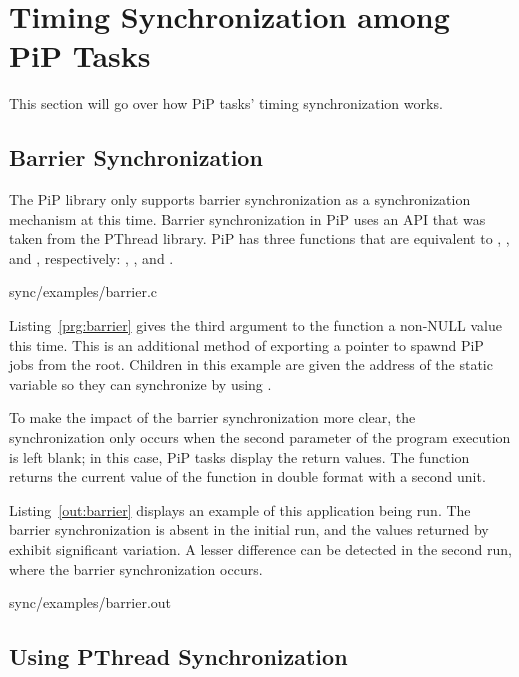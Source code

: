 
\section{Timing Synchronization among PiP Tasks}

This section will go over how PiP tasks' timing synchronization works.

\subsection{Barrier Synchronization}

The PiP library only supports barrier synchronization as a
synchronization mechanism at this time. Barrier synchronization in PiP
uses an API that was taken from the PThread library. PiP has three
functions that are equivalent to ,
, and
, respectively:
, , and
. 

 {sync/examples/barrier.c}

Listing~\ref{prg:barrier} gives the third argument to the 
function a non-NULL value this time. This is an additional method of
exporting a pointer to spawnd PiP jobs from the root. Children in this
example are given the address of the  static
variable so they can synchronize by using .

To make the impact of the barrier synchronization more clear, the
synchronization only occurs when the second parameter of the program
execution is left blank; in this case, PiP tasks display the
 return values. The 
function returns the current value of the 
function in double format with a second unit.

Listing~\ref{out:barrier} displays an example of this application
being run. The barrier synchronization is absent in the initial run,
and the values returned by  exhibit
significant variation. A lesser difference can be detected in the
second run, where the barrier synchronization occurs.

 {sync/examples/barrier.out}

\subsection{Using PThread Synchronization}

